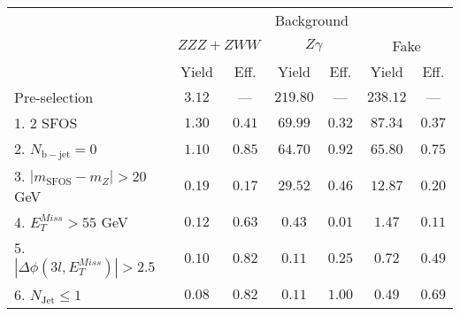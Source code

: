 \begin{tabular}{l||c|c||c|c||c|c}
\hline
 &       \multicolumn{6}{c}{Background} \\
 & \multicolumn{2}{c||}{$ZZZ+ZWW$} & \multicolumn{2}{c||}{$Z\gamma$} & \multicolumn{2}{c}{Fake} \\ 
 & Yield & Eff. & Yield & Eff. & Yield & Eff. \\
\hline\hline
Pre-selection & $3.12$ & --- &  $219.80$ & --- &  $238.12$ & ---  \\ 
\hline
1. 2 SFOS &  $1.30$ &  $0.41$ &  $69.99$ &  $0.32$ &  $87.34$ &  $0.37$ \\ 
\hline
2. $N_{\mathrm{b-jet}}=0$ &  $1.10$ &  $0.85$ &  $64.70$ &  $0.92$ &  $65.80$ &  $0.75$ \\ 
\hline
3. $| m_{\mathrm{SFOS}} - m_Z | >  20$ GeV &  $0.19$ &  $0.17$ &  $29.52$ &  $0.46$ &  $12.87$ &  $0.20$ \\ 
\hline
4. $E_{T}^{Miss} > 55$ GeV &  $0.12$ &  $0.63$ &  $0.43$ &  $0.01$ &  $1.47$ &  $0.11$ \\ 
\hline
5. $|\Delta\phi(3l,E_{T}^{Miss})| > 2.5$ &  $0.10$ &  $0.82$ &  $0.11$ &  $0.25$ &  $0.72$ &  $0.49$ \\ 
\hline
6. $N_{\mathrm{Jet}} \leq 1$ &  $0.08$ &  $0.82$ &  $0.11$ &  $1.00$ &  $0.49$ &  $0.69$ \\ 
\hline
\end{tabular}


